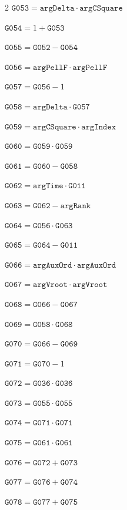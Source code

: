 \documentclass[10pt]{article}
\begin{document}
\begin{multicols}{2}
\noindent $\mathtt{G053}=\mathtt{argDelta}\cdot \mathtt{argCSquare}$\par
\noindent $\mathtt{G054}=1+\mathtt{G053}$\par
\noindent $\mathtt{G055}=\mathtt{G052}-\mathtt{G054}$\par
\noindent $\mathtt{G056}=\mathtt{argPellF}\cdot \mathtt{argPellF}$\par
\noindent $\mathtt{G057}=\mathtt{G056}-1$\par
\noindent $\mathtt{G058}=\mathtt{argDelta}\cdot \mathtt{G057}$\par
\noindent $\mathtt{G059}=\mathtt{argCSquare}\cdot \mathtt{argIndex}$\par
\noindent $\mathtt{G060}=\mathtt{G059}\cdot \mathtt{G059}$\par
\noindent $\mathtt{G061}=\mathtt{G060}-\mathtt{G058}$\par
\noindent $\mathtt{G062}=\mathtt{argTime}\cdot \mathtt{G011}$\par
\noindent $\mathtt{G063}=\mathtt{G062}-\mathtt{argRank}$\par
\noindent $\mathtt{G064}=\mathtt{G056}\cdot \mathtt{G063}$\par
\noindent $\mathtt{G065}=\mathtt{G064}-\mathtt{G011}$\par
\noindent $\mathtt{G066}=\mathtt{argAuxOrd}\cdot \mathtt{argAuxOrd}$\par
\noindent $\mathtt{G067}=\mathtt{argVroot}\cdot \mathtt{argVroot}$\par
\noindent $\mathtt{G068}=\mathtt{G066}-\mathtt{G067}$\par
\noindent $\mathtt{G069}=\mathtt{G058}\cdot \mathtt{G068}$\par
\noindent $\mathtt{G070}=\mathtt{G066}-\mathtt{G069}$\par
\noindent $\mathtt{G071}=\mathtt{G070}-1$\par
\noindent $\mathtt{G072}=\mathtt{G036}\cdot \mathtt{G036}$\par
\noindent $\mathtt{G073}=\mathtt{G055}\cdot \mathtt{G055}$\par
\noindent $\mathtt{G074}=\mathtt{G071}\cdot \mathtt{G071}$\par
\noindent $\mathtt{G075}=\mathtt{G061}\cdot \mathtt{G061}$\par
\noindent $\mathtt{G076}=\mathtt{G072}+\mathtt{G073}$\par
\noindent $\mathtt{G077}=\mathtt{G076}+\mathtt{G074}$\par
\noindent $\mathtt{G078}=\mathtt{G077}+\mathtt{G075}$\par

\end{multicols}
\end{document}
